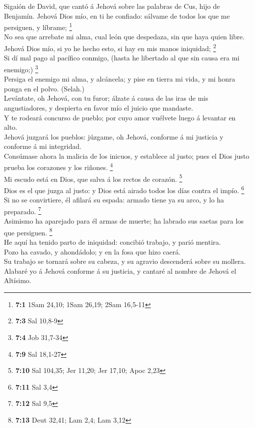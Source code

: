  Sigaión de David, que cantó á Jehová sobre las palabras
de Cus, hijo de Benjamín. Jehová Dios mío, en ti he confiado: sálvame de
todos los que me persiguen, y líbrame; \footnote{\textbf{7:1} 1Sam
  24,10; 1Sam 26,19; 2Sam 16,5-11}\\
 No sea que arrebate mi alma, cual león que despedaza, sin
que haya quien libre.\\
 Jehová Dios mío, si yo he hecho esto, si hay en mis manos
iniquidad; \footnote{\textbf{7:3} Sal 10,8-9}\\
 Si dí mal pago al pacífico conmigo, (hasta he libertado
al que sin causa era mi enemigo;) \footnote{\textbf{7:4} Job 31,7-34}\\
 Persiga el enemigo mi alma, y alcáncela; y pise en tierra
mi vida, y mi honra ponga en el polvo. (Selah.)\\
 Levántate, oh Jehová, con tu furor; álzate á causa de las
iras de mis angustiadores, y despierta en favor mío el juicio que
mandaste.\\
 Y te rodeará concurso de pueblo; por cuyo amor vuélvete
luego á levantar en alto.\\
 Jehová juzgará los pueblos: júzgame, oh Jehová, conforme
á mi justicia y conforme á mi integridad.\\
 Consúmase ahora la malicia de los inicuos, y establece al
justo; pues el Dios justo prueba los corazones y los riñones.
\footnote{\textbf{7:9} Sal 18,1-27}\\
 Mi escudo está en Dios, que salva á los rectos de
corazón. \footnote{\textbf{7:10} Sal 104,35; Jer 11,20; Jer 17,10; Apoc
  2,23}\\
 Dios es el que juzga al justo: y Dios está airado todos
los días contra el impío. \footnote{\textbf{7:11} Sal 3,4}\\
 Si no se convirtiere, él afilará su espada: armado tiene
ya su arco, y lo ha preparado. \footnote{\textbf{7:12} Sal 9,5}\\
 Asimismo ha aparejado para él armas de muerte; ha
labrado sus saetas para los que persiguen. \footnote{\textbf{7:13} Deut
  32,41; Lam 2,4; Lam 3,12}\\
 He aquí ha tenido parto de iniquidad: concibió trabajo,
y parió mentira.\\
 Pozo ha cavado, y ahondádolo; y en la fosa que hizo
caerá.\\
 Su trabajo se tornará sobre su cabeza, y su agravio
descenderá sobre su mollera.\\
 Alabaré yo á Jehová conforme á su justicia, y cantaré al
nombre de Jehová el Altísimo.

